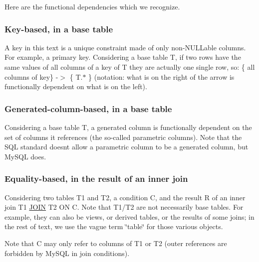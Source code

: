 Here are the functional dependencies which we recognize.\hypertarget{group__AGGREGATE__CHECKS_KEYFD}{}\subsubsection{Key-\/based, in a base table}\label{group__AGGREGATE__CHECKS_KEYFD}
A key in this text is a unique constraint made of only non-\/N\+U\+L\+Lable columns. For example, a primary key. Considering a base table T, if two rows have the same values of all columns of a key of T they are actually one single row, so\+: \{ all columns of key\} -\/$>$ \{ T.$\ast$ \} (notation\+: what is on the right of the arrow is functionally dependent on what is on the left).\hypertarget{group__AGGREGATE__CHECKS_GCOLFD}{}\subsubsection{Generated-\/column-\/based, in a base table}\label{group__AGGREGATE__CHECKS_GCOLFD}
Considering a base table T, a generated column is functionally dependent on the set of columns it references (the so-\/called parametric columns). Note that the S\+QL standard doesn\textquotesingle{}t allow a parametric column to be a generated column, but My\+S\+QL does.\hypertarget{group__AGGREGATE__CHECKS_INNEREQ}{}\subsubsection{Equality-\/based, in the result of an inner join}\label{group__AGGREGATE__CHECKS_INNEREQ}
Considering two tables T1 and T2, a condition C, and the result R of an inner join T1 \mbox{\hyperlink{classJOIN}{J\+O\+IN}} T2 ON C. Note that T1/T2 are not necessarily base tables. For example, they can also be views, or derived tables, or the results of some joins; in the rest of text, we use the vague term \char`\"{}table\char`\"{} for those various objects.

Note that C may only refer to columns of T1 or T2 (outer references are forbidden by My\+S\+QL in join conditions).

